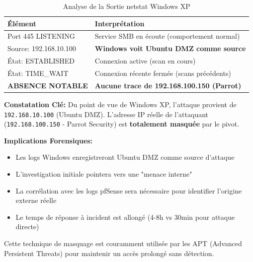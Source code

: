 \documentclass[12pt,a4paper,openany]{report}
\newcommand{\tableheadcolor}{\rowcolor{tableheadbg}}
\begin{document}
\begin{table}[H]
	\centering
	\renewcommand{\arraystretch}{1.4}
	\setlength{\arrayrulewidth}{0.5pt}
	\begin{tabular}{p{4.5cm} p{8.5cm}}
		\arrayrulecolor{tableborder}
		\hline
		\tableheadcolor
		\textcolor{tableheadfg}{\textbf{Élément}} &
		\textcolor{tableheadfg}{\textbf{Interprétation}} \\
		\hline
		\rowcolor{tablerowalt}
		Port 445 LISTENING & 
		Service SMB en écoute (comportement normal) \\
		
		Source: 192.168.10.100 & 
		\textbf{Windows voit Ubuntu DMZ comme source} \\
		
		\rowcolor{tablerowalt}
		État: ESTABLISHED & 
		Connexion active (scan en cours) \\
		
		État: TIME\_WAIT & 
		Connexion récente fermée (scans précédents) \\
		
		\rowcolor{tablerowalt}
		\textcolor{accent}{\textbf{ABSENCE NOTABLE}} & 
		\textbf{Aucune trace de 192.168.100.150 (Parrot)} \\
		\hline
	\end{tabular}
	\caption{Analyse de la Sortie netstat Windows XP}
\end{table}

\textbf{Constatation Clé:} Du point de vue de Windows XP, l'attaque 
provient de \texttt{192.168.10.100} (Ubuntu DMZ). L'adresse IP réelle 
de l'attaquant (\texttt{192.168.100.150} - Parrot Security) est 
\textbf{totalement masquée} par le pivot.

\textbf{Implications Forensiques:}
\begin{itemize}
	\item Les logs Windows enregistreront Ubuntu DMZ comme source d'attaque
	\item L'investigation initiale pointera vers une "menace interne"
	\item La corrélation avec les logs pfSense sera nécessaire pour 
	identifier l'origine externe réelle
	\item Le temps de réponse à incident est allongé (4-8h vs 30min 
	pour attaque directe)
\end{itemize}

Cette technique de masquage est couramment utilisée par les APT 
(Advanced Persistent Threats) pour maintenir un accès prolongé 
sans détection.
\end{document}
